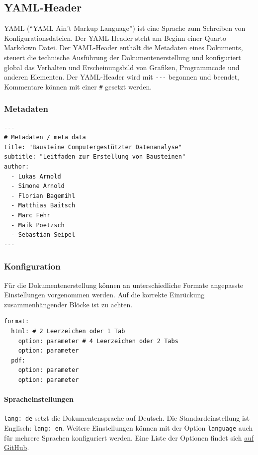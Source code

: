 \documentclass[
  letterpaper,
  DIV=11]{scrartcl}
\let\oldparagraph\paragraph
\renewcommand{\paragraph}[1]{\oldparagraph{#1}\mbox{}}
\begin{document}
\subsection{YAML-Header}\label{yaml-header}

YAML (``YAML Ain't Markup Language'') ist eine Sprache zum Schreiben von
Konfigurationsdateien. Der YAML-Header steht am Beginn einer Quarto
Markdown Datei. Der YAML-Header enthält die Metadaten eines Dokuments,
steuert die technische Ausführung der Dokumentenerstellung und
konfiguriert global das Verhalten und Erscheinungsbild von Grafiken,
Programmcode und anderen Elementen. Der YAML-Header wird mit
\texttt{-\/-\/-} begonnen und beendet, Kommentare können mit einer
\texttt{\#} gesetzt werden.

\subsubsection{Metadaten}\label{metadaten}

\begin{verbatim}
---
# Metadaten / meta data
title: "Bausteine Computergestützter Datenanalyse"
subtitle: "Leitfaden zur Erstellung von Bausteinen"
author:
  - Lukas Arnold
  - Simone Arnold
  - Florian Bagemihl
  - Matthias Baitsch
  - Marc Fehr
  - Maik Poetzsch
  - Sebastian Seipel
---
\end{verbatim}

\subsubsection{Konfiguration}\label{konfiguration}

Für die Dokumentenerstellung können an unterschiedliche Formate
angepasste Einstellungen vorgenommen werden. Auf die korrekte Einrückung
zusammenhängender Blöcke ist zu achten.

\begin{verbatim}
format:
  html: # 2 Leerzeichen oder 1 Tab
    option: parameter # 4 Leerzeichen oder 2 Tabs
    option: parameter
  pdf:  
    option: parameter  
    option: parameter
\end{verbatim}

\paragraph{Spracheinstellungen}\label{spracheinstellungen}

\texttt{lang:\ de} setzt die Dokumentensprache auf Deutsch. Die
Standardeinstellung ist Englisch: \texttt{lang:\ en}. Weitere
Einstellungen können mit der Option \texttt{language} auch für mehrere
Sprachen konfiguriert werden. Eine Liste der Optionen findet sich
\href{https://github.com/quarto-dev/quarto-cli/blob/main/src/resources/language/_language.yml}{auf
GitHub}.
\end{document}
